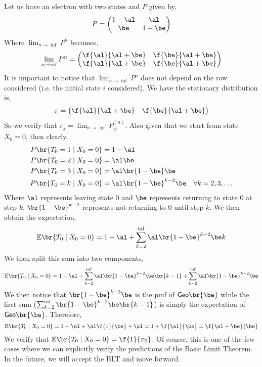 \documentclass{article}
\newcommand{\Exp}{\mathbb{E}}
\newcommand{\Geo}{\mathsf{Geo}}
\begin{document}
\begin{example}
    Let us have an electron with two states and $P$ given by,
    \[ P = \begin{pmatrix}
        1 - \al & \al \\
       \be & 1 - \be \\
    \end{pmatrix} \]
    Where $\lim_{n \to \inf} P^n$ becomes,
    \[ \lim_{n \to \inf} P^n = \begin{pmatrix}
        \f{\al}{\al + \be} & \f{\be}{\al + \be} \\
        \f{\al}{\al + \be} & \f{\be}{\al + \be} \\
    \end{pmatrix} \]
    It is important to notice that $\lim_{n \to \inf} P^n$ does not depend on the row considered (i.e. the initial state $i$ considered). We have the stationary distribution is,
    \[ \pi = \begin{pmatrix}
        \f{\al}{\al + \be} & \f{\be}{\al + \be} \\
    \end{pmatrix} \]
    So we verify that $\pi_j = \lim_{n \to \inf} P_{ij}^{(n)}$. Also given that we start from state $X_0 = 0$, then clearly,
    \begin{align*}
        P\br{T_0 = 1 \mid X_0 = 0} &= 1 - \al \\
        P\br{T_0 = 2 \mid X_0 = 0} &= \al \be \\
        P\br{T_0 = 3 \mid X_0 = 0} &= \al \br{1 - \be} \be \\
        P\br{T_0 = k \mid X_0 = 0} &= \al  \br{1 - \be}^{k-2}  \be   \quad \forall k= 2, 3, \ldots
    \end{align*}
    Where $\al$ represents leaving state $0$ and $\be$ represents returning to state $0$ at step $k$. $\br{1- \be}^{k-2}$ represents not returning to $0$ until step $k$. We then obtain the expectation,
    \[ \Exp\br{T_0 \mid X_0 = 0} = 1 - \al + \sum_{k=2}^{\inf} \al \br{1- \be}^{k-2} \be k \]
    We then split this sum into two components,
    \[ \Exp\br{T_0 \mid X_0 = 0} = 1 - \al + \sum_{k=2}^{\inf} \al \br{1- \be}^{k-2} \be \br{k - 1} + \sum_{k=2}^{\inf} \al \br{1- \be}^{k-2} \be\]
    We then notice that $\br{1- \be}^{k-2} \be$ is the pmf of $\Geo\br{\be}$ while the first sum ($\sum_{k=2}^{\inf} \br{1- \be}^{k-2} \be \br{k - 1}$) is simply the expectation of $\Geo\br{\be}$. Therefore,
    \[ \Exp\br{T_0 \mid X_0 = 0} = 1 - \al + \al \f{1}{\be} + \al = 1 + \f{\al}{\be} = \f{\al + \be}{\be}\]
    We verify that $\Exp\br{T_0 \mid X_0 = 0} = \f{1}{\pi_0}$. Of course, this is one of the few cases where we can explicitly verify the predictions of the Basic Limit Theorem. In the future, we will accept the BLT and move forward.
    \end{example}
\end{document}
